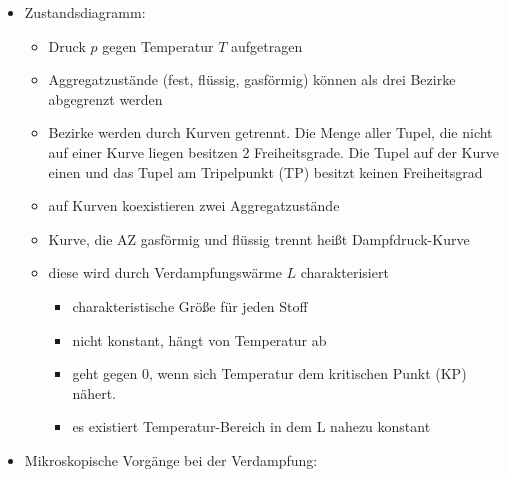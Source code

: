 \begin{itemize}
		\item Zustandsdiagramm:
			\begin{itemize}
			\item Druck $p$ gegen Temperatur $T$ aufgetragen
			\item Aggregatzustände (fest, flüssig, gasförmig) können als drei Bezirke abgegrenzt werden
			\item Bezirke werden durch Kurven getrennt.
				Die Menge aller Tupel, die nicht auf einer Kurve liegen besitzen 2 Freiheitsgrade. Die Tupel auf der Kurve einen und das Tupel am Tripelpunkt (TP) besitzt keinen Freiheitsgrad
			\item auf Kurven koexistieren zwei Aggregatzustände
			\item Kurve, die AZ gasförmig und flüssig trennt heißt Dampfdruck-Kurve
			\item diese wird durch Verdampfungswärme $L$ charakterisiert
			\begin{itemize}
					\item charakteristische Größe für jeden Stoff
					\item nicht konstant, hängt von Temperatur ab
					\item geht gegen $0$, wenn sich Temperatur dem kritischen Punkt (KP) nähert.
					\item es existiert Temperatur-Bereich in dem L nahezu konstant
			\end{itemize}
			\end{itemize}
		\item Mikroskopische Vorgänge bei der Verdampfung: 
			\begin{itemize}


\end{itemize}
\end{itemize}

